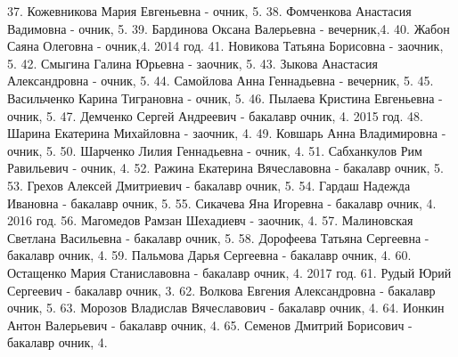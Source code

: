 37. Кожевникова Мария Евгеньевна - очник, 5.
38. Фомченкова Анастасия Вадимовна - очник, 5.
39. Бардинова Оксана Валерьевна - вечерник,4.
40. Жабон Саяна Олеговна - очник,4.
2014 год.
41. Новикова Татьяна Борисовна - заочник, 5.
42. Смыгина Галина Юрьевна - заочник, 5.
43. Зыкова Анастасия Александровна - очник, 5.
44. Самойлова Анна Геннадьевна - вечерник, 5.
45. Васильченко Карина Тиграновна - очник, 5.
46. Пылаева Кристина Евгеньевна - очник, 5.
47. Демченко Сергей Андреевич - бакалавр очник, 4.
2015 год.
48. Шарина Екатерина Михайловна - заочник, 4.
49. Ковшарь Анна Владимировна - очник, 5.
50. Шарченко Лилия Геннадьевна - очник, 4.
51. Сабханкулов Рим Равильевич - очник, 4.
52. Ражина Екатерина Вячеславовна - бакалавр очник, 5.
53. Грехов Алексей Дмитриевич - бакалавр очник, 5.
54. Гардаш Надежда Ивановна - бакалавр очник, 5.
55. Сикачева Яна Игоревна - бакалавр очник, 4.
2016 год.
56. Магомедов Рамзан Шехадиевч - заочник, 4.
57. Малиновская Светлана Васильевна - бакалавр очник, 5.
58. Дорофеева Татьяна Сергеевна - бакалавр очник, 4.
59. Пальмова Дарья Сергеевна - бакалавр очник, 4.
60. Остащенко Мария Станиславовна - бакалавр очник, 4.
2017 год.
61. Рудый Юрий Сергеевич - бакалавр очник, 3.
62. Волкова Евгения Александровна - бакалавр очник, 5.
63. Морозов Владислав Вячеславович - бакалавр очник, 4.
64. Ионкин Антон Валерьевич - бакалавр очник, 4.
65. Семенов Дмитрий Борисович - бакалавр очник, 4.